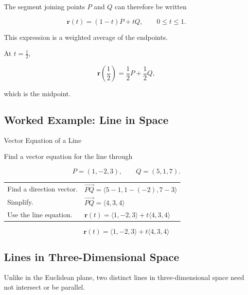 The segment joining points \(P\) and \(Q\) can therefore be written

\[
\boxed{
\mathbf{r}(t)
=
(1-t)P+tQ,
\qquad
0\leq t\leq1.
}
\]

This expression is a weighted average of the endpoints.

At \(t=\frac12\),

\[
\mathbf{r}\left(\frac12\right)
=
\frac12P+\frac12Q,
\]

which is the midpoint.

\subsection{Worked Example: Line in Space}
\label{subsec:worked-vector-line-space}

\begin{workedexamplebox}{Vector Equation of a Line}

Find a vector equation for the line through

\[ P=(1,-2,3),\qquad Q=(5,1,7). \]

\begin{tabularx}{\textwidth}{@{}>{\raggedright\arraybackslash}p{}X@{}}
Find a direction vector. &
\(\overrightarrow{PQ}
=\langle5-1,1-(-2),7-3\rangle\)\\
Simplify. &
\(\overrightarrow{PQ}=\langle4,3,4\rangle\)\\
Use the line equation. &
\(\mathbf{r}(t)=\langle1,-2,3\rangle+t\langle4,3,4\rangle\)
\end{tabularx}

\begin{answerbox}
\[ \boxed{\mathbf{r}(t)=\langle1,-2,3\rangle+t\langle4,3,4\rangle} \]
\end{answerbox}
\end{workedexamplebox}

\subsection{Lines in Three-Dimensional Space}
\label{subsec:lines-three-dimensional-space}

Unlike in the Euclidean plane, two distinct lines in three-dimensional
space need not intersect or be parallel.

